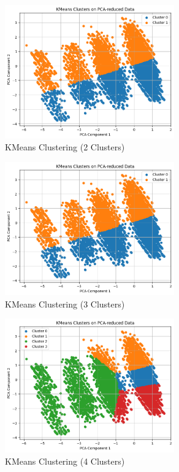 \documentclass{article}
\begin{document}
\begin{figure}[H]
\centering
\includegraphics[width=0.65\textwidth]{KMeans_clustering_2.png}
\caption{KMeans Clustering (2 Clusters)}
\end{figure}

\begin{figure}[H]
\centering
\includegraphics[width=0.65\textwidth]{KMeans_clustering_3.png}
\caption{KMeans Clustering (3 Clusters)}
\end{figure}

\begin{figure}[H]
\centering
\includegraphics[width=0.65\textwidth]{KMeans_clustering_4.png}
\caption{KMeans Clustering (4 Clusters)}
\end{figure}
\end{document}
